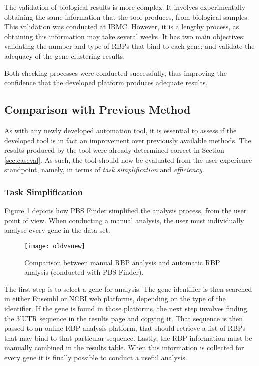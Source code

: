 The validation of biological results is more complex. It involves experimentally
obtaining the same information that the tool produces, from biological samples.
This validation was conducted at IBMC. However, it is a lengthy process, as
obtaining this information may take several weeks. It has two main objectives:
validating the number and type of RBPs that bind to each gene; and validate the
adequacy of the gene clustering results.

Both checking processes were conducted successfully, thus improving the
confidence that the developed platform produces adequate results.

\subsection{Comparison with Previous Method}\label{sec:caseperf}

As with any newly developed automation tool, it is essential to assess if the
developed tool is in fact an improvement over previously available methods. The
results produced by the tool were already determined correct in Section
\ref{sec:caseval}. As such, the tool should now be evaluated from the user
experience standpoint, namely, in terms of \emph{task simplification} and
\emph{efficiency}.

\subsubsection*{Task Simplification}

Figure \ref{fig:oldvsnew} depicts how PBS Finder simplified the analysis process,
from the user point of view. When conducting a manual analysis, the user must
individually analyse every gene in the data set.

\begin{figure}[!htb]
  \begin{center}
    \leavevmode
    \texttt{[image: oldvsnew]}
    \caption[Comparison between manual RBP analysis and automatic RBP analysis]{
      Comparison between manual RBP analysis and automatic RBP analysis
      (conducted with PBS Finder).
    }
    \label{fig:oldvsnew}
  \end{center}
\end{figure}

The first step is to select a gene for analysis. The gene identifier is then
searched in either Ensembl or NCBI web platforms, depending on the type of the
identifier. If the gene is found in those platforms, the next step involves
finding the 3'UTR sequence in the results page and copying it. That sequence is
then passed to an online RBP analysis platform, that should retrieve a list of
RBPs that may bind to that particular sequence. Lastly, the RBP information must
be manually combined in the results table. When this information is collected
for every gene it is finally possible to conduct a useful analysis.

